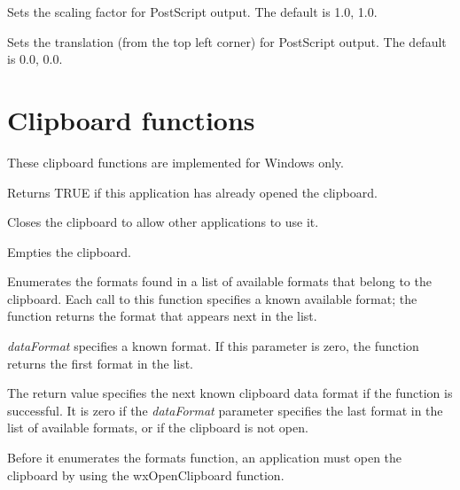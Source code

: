Sets the scaling factor for PostScript output. The default is 1.0, 1.0.



Sets the translation (from the top left corner) for PostScript output. The default is 0.0, 0.0.

\section{Clipboard functions}\label{clipsboard}

These clipboard functions are implemented for Windows only.



Returns TRUE if this application has already opened the clipboard.



Closes the clipboard to allow other applications to use it.



Empties the clipboard.



Enumerates the formats found in a list of available formats that belong
to the clipboard. Each call to this  function specifies a known
available format; the function returns the format that appears next in
the list. 

{\it dataFormat} specifies a known format. If this parameter is zero,
the function returns the first format in the list. 

The return value specifies the next known clipboard data format if the
function is successful. It is zero if the {\it dataFormat} parameter specifies
the last  format in the list of available formats, or if the clipboard
is not open. 

Before it enumerates the formats function, an application must open the clipboard by using the 
wxOpenClipboard function. 


